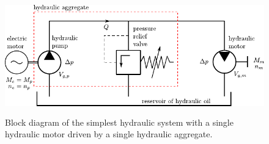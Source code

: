 \begin{figure}[ht!]
	\centering
		\includegraphics[height=5cm]{PositiveDisplacementPumps/Figures/Sizing_Of_System_With_Motor.pdf}
	\caption{Block diagram of the simplest hydraulic system with a single hydraulic motor driven by a single hydraulic aggregate.}
	\label{fig:hydraulic_aggregate_with_motor}
\end{figure}

